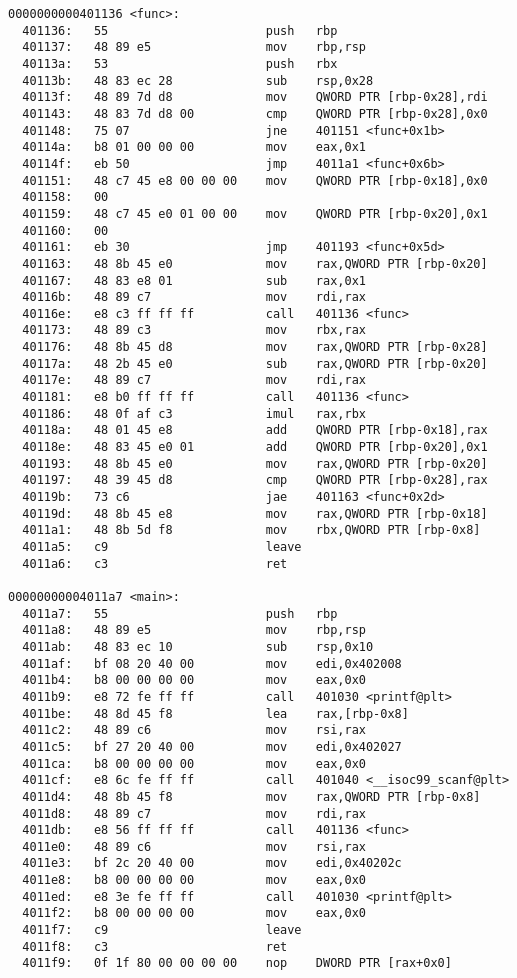 \documentclass{article}
\begin{document}
\begin{lstlisting}[style=customasm, title={Program2: main and func}, label=program2]
0000000000401136 <func>:
  401136:	55                   	push   rbp
  401137:	48 89 e5             	mov    rbp,rsp
  40113a:	53                   	push   rbx
  40113b:	48 83 ec 28          	sub    rsp,0x28
  40113f:	48 89 7d d8          	mov    QWORD PTR [rbp-0x28],rdi
  401143:	48 83 7d d8 00       	cmp    QWORD PTR [rbp-0x28],0x0
  401148:	75 07                	jne    401151 <func+0x1b>
  40114a:	b8 01 00 00 00       	mov    eax,0x1
  40114f:	eb 50                	jmp    4011a1 <func+0x6b>
  401151:	48 c7 45 e8 00 00 00 	mov    QWORD PTR [rbp-0x18],0x0
  401158:	00 
  401159:	48 c7 45 e0 01 00 00 	mov    QWORD PTR [rbp-0x20],0x1
  401160:	00 
  401161:	eb 30                	jmp    401193 <func+0x5d>
  401163:	48 8b 45 e0          	mov    rax,QWORD PTR [rbp-0x20]
  401167:	48 83 e8 01          	sub    rax,0x1
  40116b:	48 89 c7             	mov    rdi,rax
  40116e:	e8 c3 ff ff ff       	call   401136 <func>
  401173:	48 89 c3             	mov    rbx,rax
  401176:	48 8b 45 d8          	mov    rax,QWORD PTR [rbp-0x28]
  40117a:	48 2b 45 e0          	sub    rax,QWORD PTR [rbp-0x20]
  40117e:	48 89 c7             	mov    rdi,rax
  401181:	e8 b0 ff ff ff       	call   401136 <func>
  401186:	48 0f af c3          	imul   rax,rbx
  40118a:	48 01 45 e8          	add    QWORD PTR [rbp-0x18],rax
  40118e:	48 83 45 e0 01       	add    QWORD PTR [rbp-0x20],0x1
  401193:	48 8b 45 e0          	mov    rax,QWORD PTR [rbp-0x20]
  401197:	48 39 45 d8          	cmp    QWORD PTR [rbp-0x28],rax
  40119b:	73 c6                	jae    401163 <func+0x2d>
  40119d:	48 8b 45 e8          	mov    rax,QWORD PTR [rbp-0x18]
  4011a1:	48 8b 5d f8          	mov    rbx,QWORD PTR [rbp-0x8]
  4011a5:	c9                   	leave  
  4011a6:	c3                   	ret    

00000000004011a7 <main>:
  4011a7:	55                   	push   rbp
  4011a8:	48 89 e5             	mov    rbp,rsp
  4011ab:	48 83 ec 10          	sub    rsp,0x10
  4011af:	bf 08 20 40 00       	mov    edi,0x402008
  4011b4:	b8 00 00 00 00       	mov    eax,0x0
  4011b9:	e8 72 fe ff ff       	call   401030 <printf@plt>
  4011be:	48 8d 45 f8          	lea    rax,[rbp-0x8]
  4011c2:	48 89 c6             	mov    rsi,rax
  4011c5:	bf 27 20 40 00       	mov    edi,0x402027
  4011ca:	b8 00 00 00 00       	mov    eax,0x0
  4011cf:	e8 6c fe ff ff       	call   401040 <__isoc99_scanf@plt>
  4011d4:	48 8b 45 f8          	mov    rax,QWORD PTR [rbp-0x8]
  4011d8:	48 89 c7             	mov    rdi,rax
  4011db:	e8 56 ff ff ff       	call   401136 <func>
  4011e0:	48 89 c6             	mov    rsi,rax
  4011e3:	bf 2c 20 40 00       	mov    edi,0x40202c
  4011e8:	b8 00 00 00 00       	mov    eax,0x0
  4011ed:	e8 3e fe ff ff       	call   401030 <printf@plt>
  4011f2:	b8 00 00 00 00       	mov    eax,0x0
  4011f7:	c9                   	leave  
  4011f8:	c3                   	ret    
  4011f9:	0f 1f 80 00 00 00 00 	nop    DWORD PTR [rax+0x0]
  \end{lstlisting}
\end{document}
